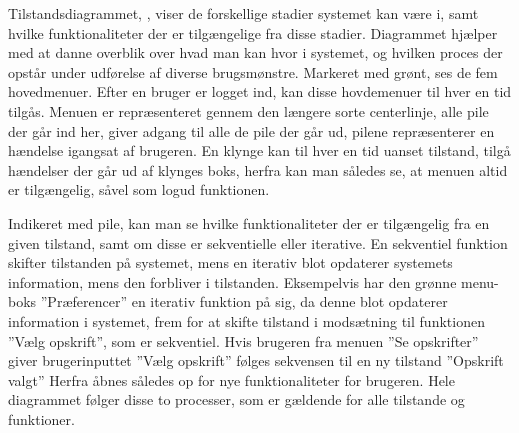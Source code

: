 Tilstandsdiagrammet, , viser de forskellige stadier systemet kan være i, samt hvilke funktionaliteter der er tilgængelige fra disse stadier.
Diagrammet hjælper med at danne overblik over hvad man kan hvor i systemet, og hvilken proces der opstår under udførelse af diverse brugsmønstre.
Markeret med grønt, ses de fem hovedmenuer.
Efter en bruger er logget ind, kan disse hovdemenuer til hver en tid tilgås.
Menuen er repræsenteret gennem den længere sorte centerlinje,  alle pile der går ind her, giver adgang til alle de pile der går ud, pilene repræsenterer en hændelse igangsat af brugeren.
En klynge kan  til hver en tid uanset tilstand, tilgå hændelser der går ud af klynges boks, herfra kan man således se, at menuen altid er tilgængelig, såvel som logud funktionen.

Indikeret med pile, kan man se hvilke funktionaliteter der er tilgængelig fra en given tilstand, samt om disse er sekventielle eller iterative.
En sekventiel funktion skifter tilstanden på systemet, mens en iterativ blot opdaterer systemets information, mens den forbliver i tilstanden.
Eksempelvis har den grønne menu-boks ''Præferencer'' en iterativ funktion på sig, da denne blot opdaterer information i systemet, frem for at skifte tilstand i modsætning til funktionen ''Vælg opskrift'', som er sekventiel.
Hvis brugeren fra menuen ''Se opskrifter'' giver brugerinputtet ''Vælg opskrift'' følges sekvensen til en ny tilstand ''Opskrift valgt'' Herfra åbnes således op for nye funktionaliteter for brugeren.
Hele diagrammet følger disse to processer, som er gældende for alle tilstande og funktioner.\label{tdiabeskriv} 
